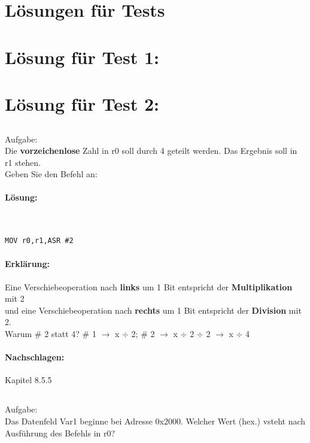 \documentclass[12pt,twoside,a4paper]{article}
\begin{document}
\newpage
\section*{Lösungen für Tests}
\section{Lösung für Test 1:}
\section{Lösung für Test 2:}
\subsection{}
Aufgabe:\\
Die \textbf{vorzeichenlose} Zahl in r0 soll durch 4 geteilt werden. Das Ergebnis soll in r1 stehen.\\
Geben Sie den Befehl an:\\


\paragraph*{Lösung:}\\

\begin{lstlisting}
MOV r0,r1,ASR #2
\end{lstlisting}


\paragraph*{Erklärung:}
Eine Verschiebeoperation nach \textbf{links} um 1 Bit entspricht der \textbf{Multiplikation} mit 2 \\
und eine Verschiebeoperation nach \textbf{rechts} um 1 Bit entspricht der \textbf{Division} mit 2. \\
Warum \# 2 statt 4? \# 1 $\rightarrow$ x $\div$ 2; \# 2 $\rightarrow$ x $\div$ 2 $\div$ 2 $\rightarrow$ x $\div$ 4 


\paragraph*{Nachschlagen:}
Kapitel 8.5.5

\subsection{}
Aufgabe:\\
Das Datenfeld Var1 beginne bei Adresse 0x2000. Welcher Wert (hex.) vsteht nach Ausführung des Befehls in r0?\\
\end{document}
